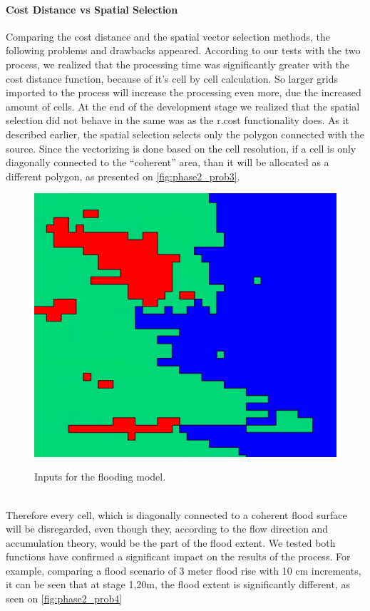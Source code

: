 \paragraph{Cost Distance vs Spatial Selection}

Comparing the cost distance and the spatial vector selection methods, the following problems and drawbacks appeared. According to our tests with the two process, we realized that the processing time was significantly greater with the cost distance function, because of it's cell by cell calculation. So larger grids imported to the process will increase the processing even more, due the increased amount of cells. At the end of the development stage we realized that the spatial selection did not behave in the same was as the r.cost functionality does. As it described earlier, the spatial selection selects only the polygon connected with the source. Since the vectorizing is done based on the cell resolution, if a cell is only diagonally connected to the “coherent” area, than it will be allocated as a different polygon, as presented on \autoref{fig:phase2_prob3}.

\begin{figure}[h!]
\centering
	{\includegraphics[width=0.8\linewidth]{gfx/Phase_2/problem3.png}}
\caption{Inputs for the flooding model.}
\label{fig:phase2_prob3}
\end{figure}\\

Therefore every cell, which is diagonally connected to a coherent flood surface will be disregarded, even though they, according to the flow direction and accumulation theory, would be the part of the flood extent. 
We tested both functions have confirmed a significant impact on the results of the process. For example, comparing a flood scenario of 3 meter flood rise with 10 cm increments, it can be seen that at stage 1,20m, the flood extent is significantly different, as seen on \autoref{fig:phase2_prob4}

